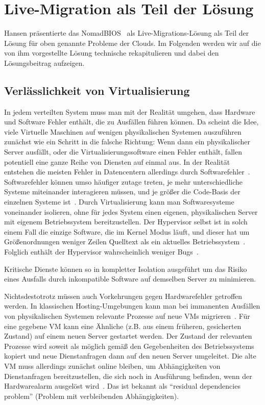 \section{Live-Migration als Teil der Lösung}
\label{sec:livemigration}
Hansen präsentierte das
NomadBIOS~\cite{nomadbioslivemigration-cloudseminar} als
Live-Migrations-Lösung als Teil der Lösung für oben genannte Probleme
der Clouds. Im Folgenden werden wir auf die von ihm vorgestellte
Lösung technische rekapitulieren und dabei den Lösungsbeitrag
aufzeigen.

\subsection{Verlässlichkeit von Virtualisierung}
In jedem verteilten System muss man mit der Realität umgehen, dass
Hardware und Software Fehler enthält, die zu Ausfällen führen
können. Da scheint die Idee, viele Virtuelle Maschinen auf wenigen
physikalischen Systemen auszuführen zunächst wie ein Schritt in die
falsche Richtung: Wenn dann ein physikalischer Server ausfällt, oder
die Virtualisierungssoftware einen Fehler enthält, fallen potentiell
eine ganze Reihe von Diensten auf einmal aus. In der Realität
entstehen die meisten Fehler in Datencentern allerdings durch
Softwarefehler~\cite{tanenbaum1992modern}. Softwarefehler können umso
häufiger zutage treten, je mehr unterschiedliche Systeme miteinander
interagieren müssen, und je größer die Code-Basis der einzelnen
Systeme ist~\cite{zellerprograms}. Durch Virtualisierung kann man
Softwaresysteme voneinander isolieren, ohne für jedes System einen
eigenen, physikalischen Server mit eigenem Betriebssystem
bereitzustellen. Der Hypervisor selbst ist in solch einem Fall die
einzige Software, die im Kernel Modus läuft, und dieser hat um
Größenordnungen weniger Zeilen Quelltext als ein aktuelles
Betriebssystem~\cite{tanenbaum1992modern}. Folglich enthält der
Hypervisor wahrscheinlich weniger Bugs~\cite{zellerprograms}.

Kritische Dienste können so in kompletter Isolation ausgeführt um das
Risiko eines Ausfalls durch inkompatible Software auf demselben Server
zu minimieren.

Nichtsdestotrotz müssen auch Vorkehrungen gegen Hardwarefehler
getroffen werden. In klassischen Hosting-Umgebungen kann man bei
immanenten Ausfällen von physikalischen Systemen relevante Prozesse
auf neue VMs migrieren~\cite{hansen2004self}. Für eine gegebene VM
kann eine Ähnliche (z.B. aus einem früheren, gesicherten Zustand) auf
einem neuen Server gestartet werden. Der Zustand der relevanten
Prozesse wird soweit als möglich gemäß den Gegebenheiten des
Betriebssystems kopiert und neue Dienstanfragen dann auf den neuen
Server umgeleitet. Die alte VM muss allerdings zunächst online
bleiben, um Abhängigkeiten von Dienstanfragen bereitzustellen, die
sich noch in Ausführung befinden, wenn der Hardwarealarm ausgelöst
wird~\cite{clark2005live}. Das ist bekannt als "`residual
dependencies problem"' (Problem mit verbleibenden Abhängigkeiten).

